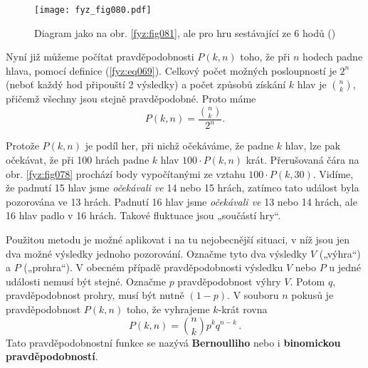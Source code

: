     \begin{figure}[ht!]  %
      \centering
      \texttt{[image: fyz\_fig080.pdf]}
      \caption{Diagram jako na obr. \ref{fyz:fig081}, ale pro hru sestávající ze \num{6} hodů
               (\cite[s.~82]{Feynman01})}
      \label{fyz:fig080}
    \end{figure}
    
    Nyní již můžeme počítat pravděpodobnosti \(P(k, n)\) toho, že při \(n\) hodech padne hlava,
    pomocí definice (\ref{fyz:eq069}). Celkový počet možných posloupností je \(2^n\) (neboť každý
    hod připouští 2 výsledky) a počet způsobů získání \(k\) hlav je \(\binom{n}{k}\), přičemž
    všechny jsou stejně pravděpodobné. Proto máme
    \begin{equation}\label{fyz:eq075}
      P(k,n) = 
      \frac{\binom{n}{k}}{2^n}.
    \end{equation}
    
    Protože \(P(k, n)\) je podíl her, při nichž očekáváme, že padne \(k\) hlav, lze pak očekávat, 
    že při \num{100} hrách padne \(k\) hlav \(100\cdot P(k, n)\) krát. Přerušovaná čára na obr. 
    \ref{fyz:fig078} prochází body vypočítanými ze vztahu \(100\cdot P(k, 30)\). Vidíme, že padnutí 
    \num{15} hlav jsme \emph{očekávali ve} \num{14} nebo \num{15} hrách, zatímco tato událost byla 
    pozorována ve \num{13} hrách. Padnutí \num{16} hlav jsme \emph{očekávali ve} \num{13} nebo 
    \num{14} hrách, ale \num{16} hlav padlo v \num{16} hrách. Takové fluktuace jsou „součástí hry“.
    
    Použitou metodu je možné aplikovat i na tu nejobecnější situaci, v níž jsou jen dva možné 
    výsledky jednoho pozorování. Označme tyto dva výsledky \(V\) („výhra“) a \(P\) („prohra“). V 
    obecném případě pravděpodobnosti výsledku \(V\) nebo \(P\) u jedné události nemusí být stejné. 
    Označme \(p\) pravděpodobnost výhry \(V\). Potom \(q\), pravděpodobnost prohry, musí být nutně 
    \((1 - p)\). V souboru \(n\) pokusů je pravděpodobnost \(P(k, n)\) toho, že vyhrajeme 
    \(k\)-krát rovna
    \begin{equation}\label{fyz:eq076}
      \boxed{P(k,n) = \binom{n}{k}p^kq^{n-k}}\,.
    \end{equation}
    Tato pravděpodobnostní funkce se nazývá \textbf{Bernoulliho} nebo i \textbf{binomickou 
    pravděpodobností}.
    
